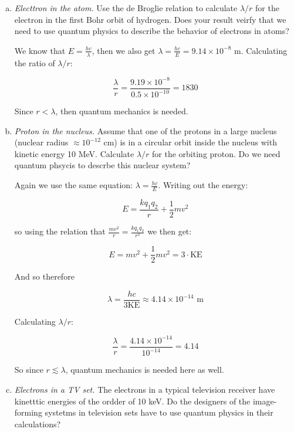 \documentclass[10pt]{article}
\begin{document}
    \begin{enumerate}[(a)]
        \item \textit{Electtron in the atom.} Use the de Broglie relation to calculate $\lambda/r$ for the electron in the first Bohr orbit of hydrogen. Does your result veirfy that we need to use quantum physics to describe the behavior of electrons in atoms?
        
        \begin{solution}
            We know that $E = \frac{hc}{\lambda}$, then we also get $\lambda = \frac{hc}{E} = 9.14 \times 10^{-8}$ m. Calculating the ratio of $\lambda/r$:

            \[ \frac{\lambda}{r} = \frac{9.19 \times 10^{-8}}{0.5 \times 10^{-10}} = 1830\] 

            Since $r < \lambda$, then quantum mechanics is needed. 
        \end{solution}
        \item \textit{Proton in the nucleus.} Assume that one of the protons in a large nucleus (nuclear radius $\approx 10^{-12}$ cm) is in a circular orbit inside the nucleus with kinetic energy 10 MeV. Calculate $\lambda/r$ for the orbiting proton. Do we need quantum phsycis to descrbe this nuclear system?
        
        \begin{solution}
            Again we use the same equation: $\lambda = \frac{hc}{E}$. Writing out the energy:

            \[ E = \frac{kq_1q_2}{r} + \frac 12 mv^2 \]

            so using the relation that $\frac{mv^2}{r} = \frac{kq_1q_2}{r^2}$ we then get:

            \[E = mv^2 + \frac{1}{2} mv^2 = 3 \cdot \text{KE}\]

            And so therefore 

            \[ \lambda = \frac{hc}{3 \text{KE}} \approx 4.14 \times 10^{-14} \text{ m}\]

            Calculating $\lambda/r$: 

            \[ \frac \lambda r = \frac{4.14 \times 10^{-14}}{10^{-14}} = 4.14\] 

            So since $r \lesssim \lambda$, quantum mechanics is needed here as well.

        \end{solution}
        \item \textit{Electrons in a TV set.} The electrons in a typical television receiver have kinetttic energies of the ordder of 10 keV. Do the designers of the image-forming systetms in television sets have to use quantum physics in their calculations? 


\end{enumerate}
\end{document}
